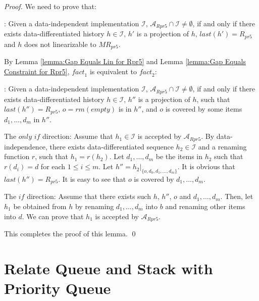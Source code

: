 \documentclass{llncs}
\begin{document}
\begin {proof}

We need to prove that:

: Given a data-independent implementation $\mathcal{I}$, $\mathcal{A}_{\textit{Rpr5}} \cap \mathcal{I} \neq \emptyset$, if and only if there exists data-differentiated history $h \in \mathcal{I}$, $h'$ is a projection of $h$, $\textit{last}(h') = R_{\textit{pr5}}$ and $h$ does not linearizable to $\textit{MR}_{\textit{pr5}}$.

By Lemma \ref{lemma:Gap Equals Lin for Rpr5} and Lemma \ref{lemma:Gap Equals Constraint for Rpr5}, $\textit{fact}_1$ is equivalent to $\textit{fact}_2$:

: Given a data-independent implementation $\mathcal{I}$, $\mathcal{A}_{\textit{Rpr5}} \cap \mathcal{I} \neq \emptyset$, if and only if there exists data-differentiated history $h \in \mathcal{I}$, $h''$ is a projection of $h$, such that $\textit{last}(h'') = R_{\textit{pr5}}$, $o = \textit{rm}(\textit{empty})$ is in $h''$, and $o$ is covered by some items $d_1,\ldots,d_m$ in $h''$.


\noindent The $\textit{only if}$ direction: Assume that $h_1 \in \mathcal{I}$ is accepted by $\mathcal{A}_{\textit{Rpr5}}$. By data-independence, there exists data-differentiated sequence $h_2 \in \mathcal{I}$ and a renaming function $r$, such that $h_1=r(h_2)$. Let $d_1,\ldots,d_m$ be the items in $h_2$ such that $r(d_i)=d$ for each $1 \leq i \leq m$. Let $h'' = h_2 \vert_{ \{ o, d_0, d_1, \ldots, d_m \} }$. It is obvious that $\textit{last}(h'') = R_{\textit{pr5}}$. It is easy to see that $o$ is covered by $d_1,\ldots,d_m$.

\noindent The $\textit{if}$ direction: Assume that there exists such $h$, $h''$, $o$ and $d_1,\ldots,d_m$. Then, let $h_1$ be obtained from $h$ by renaming $d_1,\ldots,d_m$ into $b$ and renaming other items into $d$. We can prove that $h_1$ is accepted by $\mathcal{A}_{\textit{Rpr5}}$.

This completes the proof of this lemma. \qed
\end {proof}




\section{Relate Queue and Stack with Priority Queue}
\label{sec:relate queue and stack with priority queue}
\end{document}
